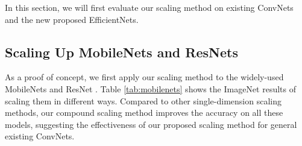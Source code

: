 \documentclass{article}
\begin{document}
In this section, we will first evaluate our scaling method on existing ConvNets and the new proposed EfficientNets.

\subsection{Scaling Up MobileNets and ResNets}

As a proof of concept, we first apply our scaling method to the widely-used MobileNets \cite{mobilenetv117,mobilenetv218} and ResNet \cite{resnet16}. Table \ref{tab:mobilenets} shows the ImageNet results of scaling them in different ways. Compared to other single-dimension scaling methods, our compound scaling method improves the accuracy on all these models, suggesting the effectiveness of our proposed scaling method for general existing ConvNets.
\end{document}
